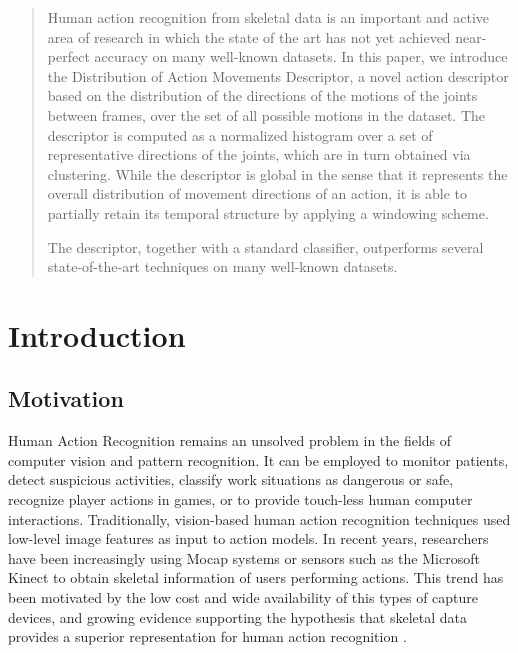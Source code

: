 \documentclass{fcs}
\begin{document}
 
\begin{abstract}



Human action recognition from skeletal data is an important and active area of research in which the state of the art has not yet achieved near-perfect accuracy on many well-known datasets. In this paper, we introduce the Distribution of Action Movements Descriptor, a novel action descriptor based on the distribution of the directions of the motions of the joints between frames, over the set of all possible motions in the dataset. The descriptor is computed as a normalized histogram over a set of representative directions of the joints, which are in turn obtained via clustering. While the descriptor is global in the sense that it represents the overall distribution of movement directions of an action, it is able to partially retain its temporal structure by applying a windowing scheme.


The descriptor, together with a standard classifier, outperforms several state-of-the-art techniques on many well-known datasets.
 \end{abstract}


\section{Introduction}

\subsection{Motivation}

\noindent Human Action Recognition remains an unsolved problem in the fields of computer vision and pattern recognition.
It can be employed to monitor patients, detect suspicious activities, classify work situations as dangerous or safe, recognize player actions in games, or to provide touch-less human computer interactions.
Traditionally, vision-based human action recognition techniques used low-level image features as input to action models. In recent years, researchers have been increasingly using Mocap systems or sensors such as the Microsoft Kinect to obtain skeletal information of users performing actions. This trend has been motivated by the low cost and wide availability of this types of capture devices, and growing evidence supporting the hypothesis that skeletal data provides a superior representation for human action recognition \cite{yao2011does}.
\end{document}
